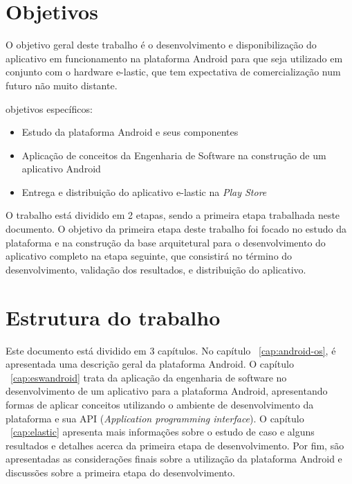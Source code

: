 \section{Objetivos}
O objetivo geral deste trabalho é o desenvolvimento e disponibilização do aplicativo em funcionamento na plataforma Android para que seja utilizado em conjunto com o hardware e-lastic, que tem expectativa de comercialização num futuro não muito distante.

objetivos específicos:
\begin{itemize}
\item Estudo da plataforma Android e seus componentes
\item Aplicação de conceitos da Engenharia de Software na construção de um aplicativo Android
\item Entrega e distribuição do aplicativo e-lastic na \textit{Play Store}
\end{itemize}

O trabalho está dividido em 2 etapas, sendo a primeira etapa trabalhada neste documento. O objetivo da primeira etapa deste trabalho foi focado no estudo da plataforma e na construção da base arquitetural para o desenvolvimento do aplicativo completo na etapa seguinte, que consistirá no término do desenvolvimento, validação dos resultados, e distribuição do aplicativo.
\section{Estrutura do trabalho}
Este documento está dividido em 3 capítulos. No capítulo ~\ref{cap:android-os}, é apresentada uma descrição geral da plataforma Android. O capítulo ~\ref{cap:eswandroid} trata da aplicação da engenharia de software no desenvolvimento de um aplicativo para a plataforma Android, apresentando formas de aplicar conceitos utilizando o ambiente de desenvolvimento da plataforma e sua API (\textit{Application programming interface}). O capítulo ~\ref{cap:elastic} apresenta mais informações sobre o estudo de caso e alguns resultados e detalhes acerca da primeira etapa de desenvolvimento. Por fim, são apresentadas as considerações finais sobre a utilização da plataforma Android e discussões sobre a primeira etapa do desenvolvimento.